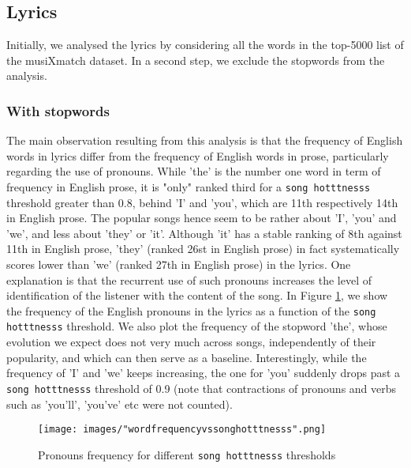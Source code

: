 \documentclass[11pt]{article}
\renewcommand\_{\textunderscore\allowbreak}
\begin{document}
\subsection{Lyrics}
Initially, we analysed the lyrics by considering all the words in the top-5000 list of the musiXmatch dataset. In a second step, we exclude the stopwords from the analysis.

\subsubsection{With stopwords}
The main observation resulting from this analysis is that the frequency of English words in lyrics differ from the frequency of English words in prose, particularly regarding the use of pronouns.
While 'the' is the number one word in term of frequency in English prose, it is "only" ranked third for a \texttt{song hotttnesss} threshold greater than 0.8, behind 'I' and 'you', which are 11th respectively 14th in English prose.
The popular songs hence seem to be rather about 'I', 'you' and 'we', and less about 'they' or 'it'.
Although 'it' has a stable ranking of 8th against 11th in English prose, 'they' (ranked 26st in English prose) in fact systematically scores lower than 'we' (ranked 27th in English prose) in the lyrics.
One explanation is that the recurrent use of such pronouns increases the level of identification of the listener with the content of the song.
In Figure \ref{fig:word_frequency_stopwords}, we show the frequency of the English pronouns in the lyrics as a function of the \texttt{song hotttnesss} threshold.
We also plot the frequency of the stopword 'the', whose evolution we expect does not very much across songs, independently of their popularity, and which can then serve as a baseline.
Interestingly, while the frequency of 'I' and 'we' keeps increasing, the one for 'you' suddenly drops past a \texttt{song hotttnesss} threshold of 0.9 (note that contractions of pronouns and verbs such as 'you'll', 'you've' etc were not counted).

\begin{figure}[h!]
\centering
\captionsetup{width=1.0\textwidth}
\texttt{[image: images/"word\_frequency\_vs\_song\_hotttnesss".png]}
\caption{Pronouns frequency for different \texttt{song hotttnesss} thresholds}
\label{fig:word_frequency_stopwords}
\end{figure}
\end{document}
